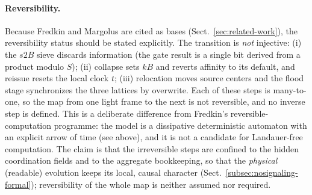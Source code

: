 \documentclass{ijuc}
\begin{document}
\paragraph{Reversibility.} Because Fredkin and Margolus are cited as bases (Sect.~\ref{sec:related-work}), the reversibility status should be stated explicitly.  The transition is \emph{not} injective: (i) the $s2B$ sieve discards information (the gate result is a single bit derived from a product modulo $S$); (ii) collapse sets $kB$ and reverts affinity to its default, and reissue resets the local clock $t$; (iii) relocation moves source centers and the flood stage synchronizes the three lattices by overwrite.  Each of these steps is many-to-one, so the map from one light frame to the next is not reversible, and no inverse step is defined.  This is a deliberate difference from Fredkin's reversible-computation programme: the model is a dissipative deterministic automaton with an explicit arrow of time (see above), and it is not a candidate for Landauer-free computation.  The claim is that the irreversible steps are confined to the hidden coordination fields and to the aggregate bookkeeping, so that the \emph{physical} (readable) evolution keeps its local, causal character (Sect.~\ref{subsec:nosignaling-formal}); reversibility of the whole map is neither assumed nor required.
\end{document}
